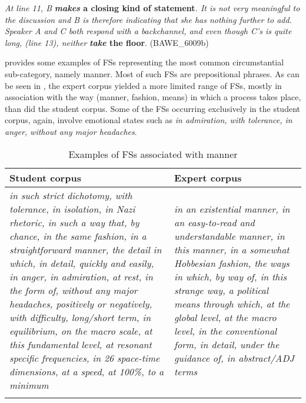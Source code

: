 \documentclass[output=paper]{langscibook}
\begin{document}
\ea \label{ex:wang:7}\textit{At line 11, B} \textbf{\textit{makes} \textbf{a} \textbf{closing} \textbf{kind} \textbf{of} \textbf{statement}}\textit{. It is not very meaningful to the discussion and B is therefore indicating that she has nothing further to add. Speaker A and C both respond with a backchannel, and even though C’s is quite long, (line 13), neither} \textbf{\textit{take} \textbf{the} \textbf{floor}}. (BAWE\_6009b)
\z

 provides some examples of FSs representing the most common circumstantial sub-category, namely manner. Most of such FSs are prepositional phrases. As can be seen in , the expert corpus yielded a more limited range of FSs, mostly in association with the way (manner, fashion, means) in which a process takes place, than did the student corpus. Some of the FSs occurring exclusively in the student corpus, again, involve emotional states such as \textit{in admiration, with tolerance, in anger, without any major headaches}. 


\begin{table}
\begin{tabularx}{\textwidth}{QQ}
\lsptoprule
Student corpus & Expert corpus\\\midrule
\textit{in such strict dichotomy, with tolerance, in isolation, in Nazi rhetoric, in such a way that, by chance, in the same fashion, in a straightforward manner, the detail in which, in detail, quickly and easily, in anger, in admiration, at rest, in the form of, without any major headaches, positively or negatively, with difficulty, long/short term, in equilibrium, on the macro scale, at this fundamental level, at resonant specific frequencies, in 26 space-time dimensions, at a speed, at 100\%, to a minimum} & \textit{in an existential manner, in an easy-to-read and understandable manner, in this manner, in a somewhat Hobbesian fashion, the ways in which, by way of, in this strange way, a political means through which, at the global level,  at the macro level, in the conventional form, in detail, under the guidance of, in abstract/ADJ terms}\\
\lspbottomrule
\end{tabularx}
\caption{Examples of FSs associated with manner\label{tab:wang:8}}
\end{table}
\end{document}
